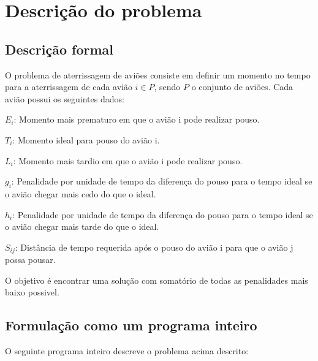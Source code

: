 \documentclass[a4paper,10pt]{abnt} %
\begin{document}
\folhaderosto
\sumario


\chapter{Descrição do problema}

\section{Descrição formal}

O problema de aterrissagem de aviões consiste em definir um momento no tempo para a aterrissagem de cada avião $ i \in P $, sendo $P$ o conjunto de aviões. Cada avião possui os seguintes dados:

$ E_i$: Momento mais prematuro em que o avião i pode realizar pouso.

$T_i$: Momento ideal para pouso do avião i.

$L_i$: Momento mais tardio em que o avião i pode realizar pouso.

$g_i$: Penalidade por unidade de tempo da diferença do pouso para o tempo ideal se o avião chegar mais cedo do que o ideal.

$h_i$: Penalidade por unidade de tempo da diferença do pouso para o tempo ideal se o avião chegar mais tarde do que o ideal.

$S_{ij}$: Distância de tempo requerida após o pouso do avião i para que o avião j possa pousar.

O objetivo é encontrar uma solução com somatório de todas as penalidades mais baixo possivel.

\section{Formulação como um programa inteiro}

O seguinte programa inteiro descreve o problema acima descrito:
\end{document}
